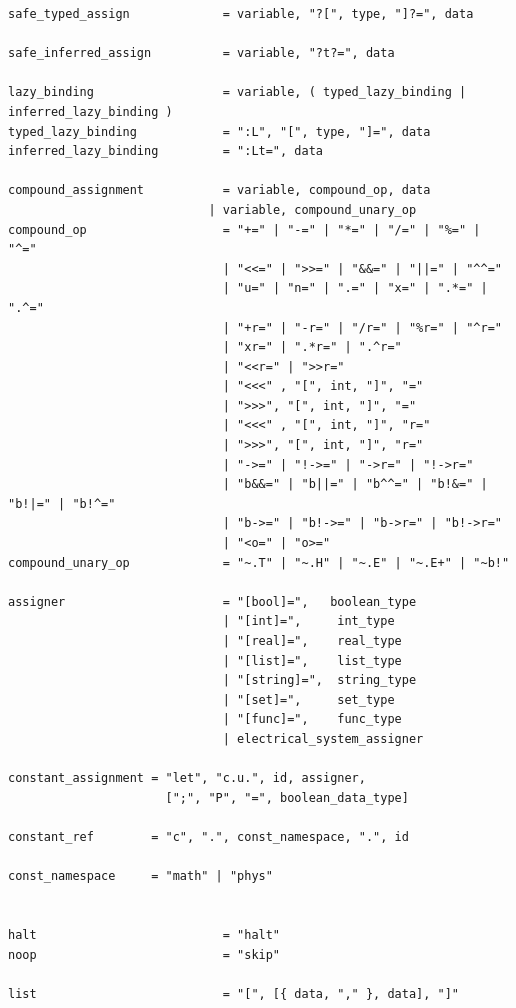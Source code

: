 \begin{verbatim}
safe_typed_assign             = variable, "?[", type, "]?=", data

safe_inferred_assign          = variable, "?t?=", data

lazy_binding                  = variable, ( typed_lazy_binding | inferred_lazy_binding )
typed_lazy_binding            = ":L", "[", type, "]=", data
inferred_lazy_binding         = ":Lt=", data

compound_assignment           = variable, compound_op, data
                            | variable, compound_unary_op
compound_op                   = "+=" | "-=" | "*=" | "/=" | "%=" | "^="
                              | "<<=" | ">>=" | "&&=" | "||=" | "^^="
                              | "u=" | "n=" | ".=" | "x=" | ".*=" | ".^="
                              | "+r=" | "-r=" | "/r=" | "%r=" | "^r="
                              | "xr=" | ".*r=" | ".^r="
                              | "<<r=" | ">>r="
                              | "<<<" , "[", int, "]", "="
                              | ">>>", "[", int, "]", "="
                              | "<<<" , "[", int, "]", "r="
                              | ">>>", "[", int, "]", "r="
                              | "->=" | "!->=" | "->r=" | "!->r="
                              | "b&&=" | "b||=" | "b^^=" | "b!&=" | "b!|=" | "b!^="
                              | "b->=" | "b!->=" | "b->r=" | "b!->r="
                              | "<o=" | "o>="
compound_unary_op             = "~.T" | "~.H" | "~.E" | "~.E+" | "~b!"

assigner                      = "[bool]=",   boolean_type
                              | "[int]=",     int_type
                              | "[real]=",    real_type
                              | "[list]=",    list_type
                              | "[string]=",  string_type
                              | "[set]=",     set_type
                              | "[func]=",    func_type
                              | electrical_system_assigner

constant_assignment = "let", "c.u.", id, assigner, 
                      [";", "P", "=", boolean_data_type]

constant_ref        = "c", ".", const_namespace, ".", id

const_namespace     = "math" | "phys"


halt                          = "halt"
noop                          = "skip"

list                          = "[", [{ data, "," }, data], "]"


\end{verbatim}
